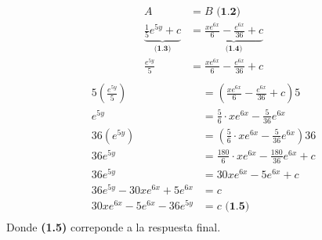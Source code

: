 \documentclass[letterpaper, 12pt]{article}
\begin{document}
\begin{equation*}
    \begin{aligned}
        A &= B\,\, \textbf{(1.2)}\\[5pt]
        \underbrace{\frac{1}{5}e^{5y}+c}_{\textbf{(1.3)}} &= \underbrace{\frac{xe^{6x}}{6}-\frac{e^{6x}}{36}+c}_{\textbf{(1.4)}}\\[5pt]
        \frac{e^{5y}}{5}&=\frac{xe^{6x}}{6}-\frac{e^{6x}}{36}+c\\[5pt]
    \end{aligned}
\end{equation*}
\begin{equation*}
    \begin{aligned}
        5\left(\frac{e^{5y}}{5}\right) &= \left(\frac{xe^{6x}}{6}-\frac{e^{6x}}{36}+c\right)5\\[5pt]
        e^{5y} &= \frac{5}{6}\cdot xe^{6x}-\frac{5}{36}e^{6x}\\[5pt]
        36\left(e^{5y}\right) &= \left(\frac{5}{6}\cdot xe^{6x}-\frac{5}{36}e^{6x}\right)36\\[5pt]
        36e^{5y} &= \frac{180}{6}\cdot xe^{6x}-\frac{180}{36}e^{6x}+c\\[5pt]
        36e^{5y} &= 30xe^{6x}-5e^{6x}+c\\[5pt]
        36e^{5y} - 30xe^{6x}+5e^{6x} &= c\\[5pt]
        30xe^{6x} - 5e^{6x} - 36e^{5y} &= c\,\, \textbf{(1.5)}\\[5pt]
    \end{aligned}
\end{equation*}
Donde \textbf{(1.5)} correponde a la respuesta final.
\end{document}
